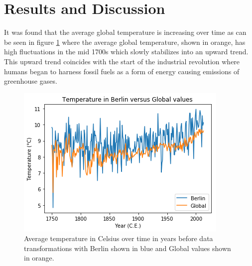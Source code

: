 \documentclass[journal, a4paper]{IEEEtran}
\begin{document}
\section{Results and Discussion}

	It was found that the average global temperature is increasing over time as can be seen in figure \ref{fig1} where the average global temperature, shown in orange, has high fluctuations in the mid 1700s which slowly stabilizes into an upward trend. This upward trend coincides with the start of the industrial revolution where humans began to harness fossil fuels as a form of energy causing emissions of greenhouse gases.\\
    
	\begin{figure}[tbh]
		\begin{center}
		\includegraphics[width=\columnwidth]{AverageTemperaturePlot.png}
		\caption{Average temperature in Celsius over time in years before data transformations with Berlin shown in blue and Global values shown in orange.}
		\label{fig1}
		\end{center}
	\end{figure}
    
\end{document}
